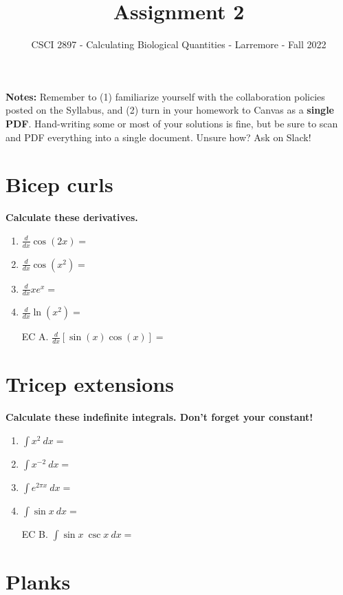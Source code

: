 \documentclass[11pt,onecolumn,superscriptaddress,notitlepage]{article}
\date{}
\newcommand{\dx}[0]{\displaystyle\frac{d}{dx}}
\begin{document}
\author{CSCI 2897 - Calculating Biological Quantities - Larremore - Fall 2022}
\title{Assignment 2}
\maketitle

{\bf Notes:} Remember to (1) familiarize yourself with the collaboration policies posted on the Syllabus, and (2) turn in your homework to Canvas as a {\bf single PDF}. Hand-writing some or most of your solutions is fine, but be sure to scan and PDF everything into a single document. Unsure how? Ask on Slack! 

\section*{Bicep curls}

{\bf Calculate these derivatives.}

\begin{enumerate}[itemsep=35pt]
	\item $\dx \cos(2x) = $
	\item $\dx \cos(x^2) = $
	\item $\dx xe^x = $
	\item $\dx \ln(x^2) = $
	\item[EC A.] $\dx \left [ \sin(x)\cos(x) \right ] = $
\end{enumerate}

\clearpage
\section*{Tricep extensions}

{\bf Calculate these indefinite integrals. Don't forget your constant!} 

\begin{enumerate}[resume,itemsep=90pt]
	\item $\displaystyle\int x^2\ dx=$
	\item $\displaystyle\int x^{-2}\ dx = $
	\item $\displaystyle\int e^{2 \pi x}\ dx = $
	\item $\displaystyle\int \sin{x}\ dx = $
	\item[EC B.] $\displaystyle\int \sin{x}\ \csc{x}\ dx = $
\end{enumerate}

\clearpage
\section*{Planks} 
\end{document}

